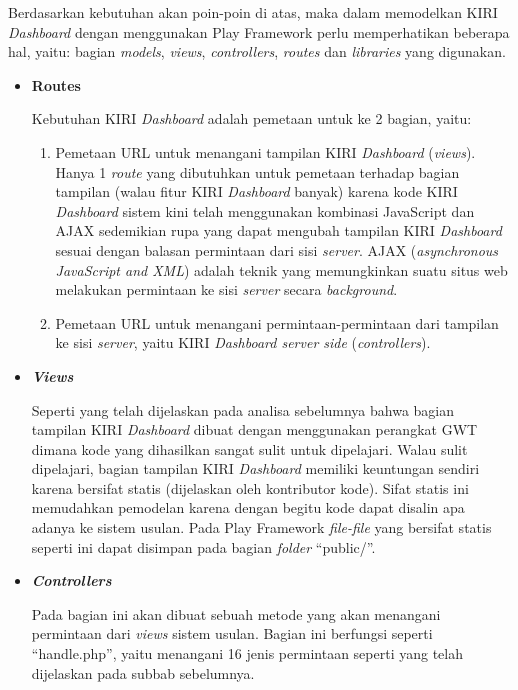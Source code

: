 \documentclass[a4paper,twoside]{article}
\begin{document}
\begin{enumerate}
\begin{enumerate}
\end{enumerate}

Berdasarkan kebutuhan akan poin-poin di atas, maka dalam memodelkan KIRI \textit{Dashboard} dengan menggunakan Play Framework perlu memperhatikan beberapa hal, yaitu: bagian \textit{models}, \textit{views}, \textit{controllers}, \textit{routes}  dan \textit{libraries} yang digunakan.

\begin{itemize}
\item \textbf{Routes}

Kebutuhan KIRI \textit{Dashboard} adalah pemetaan untuk ke 2 bagian, yaitu:
\begin{enumerate}
	\item Pemetaan URL untuk menangani tampilan KIRI \textit{Dashboard} (\textit{views}). Hanya 1 \textit{route} yang dibutuhkan untuk pemetaan terhadap bagian tampilan (walau fitur KIRI \textit{Dashboard} banyak) karena kode KIRI \textit{Dashboard} sistem kini telah menggunakan kombinasi JavaScript dan AJAX sedemikian rupa yang dapat mengubah tampilan KIRI \textit{Dashboard} sesuai dengan balasan permintaan dari sisi \textit{server}. AJAX (\textit{asynchronous JavaScript and XML}) adalah teknik yang memungkinkan suatu situs web melakukan permintaan ke sisi \textit{server} secara \textit{background}\cite{ajax}.
	\item Pemetaan URL untuk menangani permintaan-permintaan dari tampilan ke sisi \textit{server}, yaitu KIRI \textit{Dashboard server side} (\textit{controllers}).
\end{enumerate}

\item \textbf{\textit{Views}}

Seperti yang telah dijelaskan pada analisa sebelumnya bahwa bagian tampilan KIRI \textit{Dashboard} dibuat dengan menggunakan perangkat GWT dimana kode yang dihasilkan sangat sulit untuk dipelajari. Walau sulit dipelajari, bagian tampilan KIRI \textit{Dashboard} memiliki keuntungan sendiri karena bersifat statis (dijelaskan oleh kontributor kode). Sifat statis ini memudahkan pemodelan karena dengan begitu kode dapat disalin apa adanya ke sistem usulan. Pada Play Framework \textit{file-file} yang bersifat statis seperti ini dapat disimpan pada bagian \textit{folder} ``public/''.

\item \textbf{\textit{Controllers}}

Pada bagian ini akan dibuat sebuah metode yang akan menangani permintaan dari \textit{views} sistem usulan. Bagian ini berfungsi seperti ``handle.php'', yaitu menangani 16 jenis permintaan seperti yang telah dijelaskan pada subbab sebelumnya.


\end{itemize}
\end{enumerate}
\end{document}
